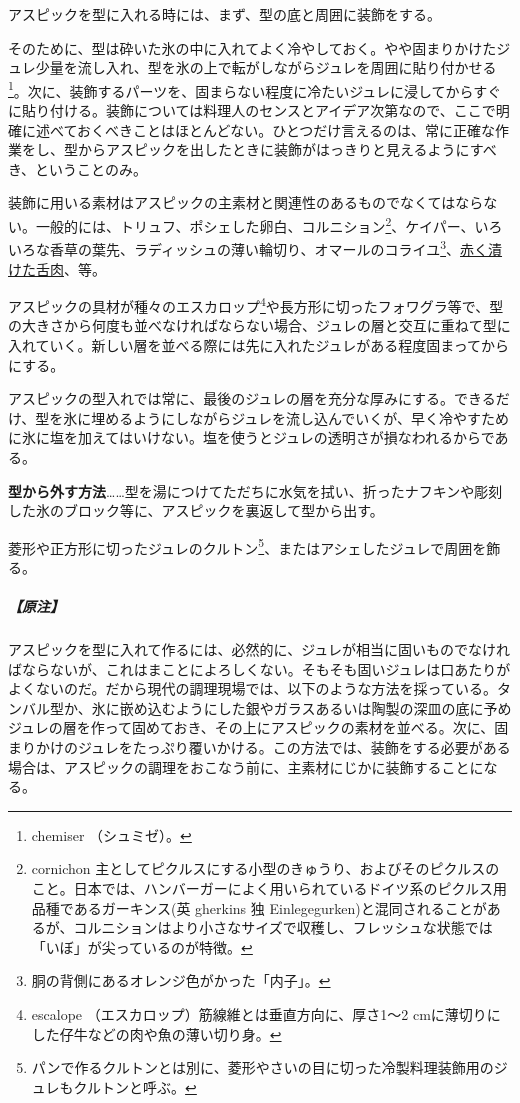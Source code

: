 \begin{main}
アスピックを型に入れる時には、まず、型の底と周囲に装飾をする。

そのために、型は砕いた氷の中に入れてよく冷やしておく。やや固まりかけたジュレ少量を流し入れ、型を氷の上で転がしながらジュレを周囲に貼り付かせる\footnote{chemiser
  （シュミゼ）。}。次に、装飾するパーツを、固まらない程度に冷たいジュレに浸してからすぐに貼り付ける。装飾については料理人のセンスとアイデア次第なので、ここで明確に述べておくべきことはほとんどない。ひとつだけ言えるのは、常に正確な作業をし、型からアスピックを出したときに装飾がはっきりと見えるようにすべき、ということのみ。

装飾に用いる素材はアスピックの主素材と関連性のあるものでなくてはならない。一般的には、トリュフ、ポシェした卵白、コルニション\footnote{cornichon
  主としてピクルスにする小型のきゅうり、およびそのピクルスのこと。日本では、ハンバーガーによく用いられているドイツ系のピクルス用品種であるガーキンス(英
  gherkins 独
  Einlegegurken)と混同されることがあるが、コルニションはより小さなサイズで収穫し、フレッシュな状態では「いぼ」が尖っているのが特徴。}、ケイパー、いろいろな香草の葉先、ラディッシュの薄い輪切り、オマールのコライユ\footnote{胴の背側にあるオレンジ色がかった「内子」。}、\protect\hyperlink{saumure-liquide-pour-langues}{赤く漬けた舌肉}、等。

アスピックの具材が種々のエスカロップ\footnote{escalope
  （エスカロップ）筋線維とは垂直方向に、厚さ1〜2
  cmに薄切りにした仔牛などの肉や魚の薄い切り身。}や長方形に切ったフォワグラ等で、型の大きさから何度も並べなければならない場合、ジュレの層と交互に重ねて型に入れていく。新しい層を並べる際には先に入れたジュレがある程度固まってからにする。

アスピックの型入れでは常に、最後のジュレの層を充分な厚みにする。できるだけ、型を氷に埋めるようにしながらジュレを流し込んでいくが、早く冷やすために氷に塩を加えてはいけない。塩を使うとジュレの透明さが損なわれるからである。

\noindent\textbf{型から外す方法}\ldots{}\ldots{}型を湯につけてただちに水気を拭い、折ったナフキンや彫刻した氷のブロック等に、アスピックを裏返して型から出す。

菱形や正方形に切ったジュレのクルトン\footnote{パンで作るクルトンとは別に、菱形やさいの目に切った冷製料理装飾用のジュレもクルトンと呼ぶ。}、またはアシェしたジュレで周囲を飾る。

\hypertarget{nota-aspics}{%
\subparagraph{【原注】}\label{nota-aspics}}

アスピックを型に入れて作るには、必然的に、ジュレが相当に固いものでなければならないが、これはまことによろしくない。そもそも固いジュレは口あたりがよくないのだ。だから現代の調理現場では、以下のような方法を採っている。タンバル型か、氷に嵌め込むようにした銀やガラスあるいは陶製の深皿の底に予めジュレの層を作って固めておき、その上にアスピックの素材を並べる。次に、固まりかけのジュレをたっぷり覆いかける。この方法では、装飾をする必要がある場合は、アスピックの調理をおこなう前に、主素材にじかに装飾することになる。


\end{main}
